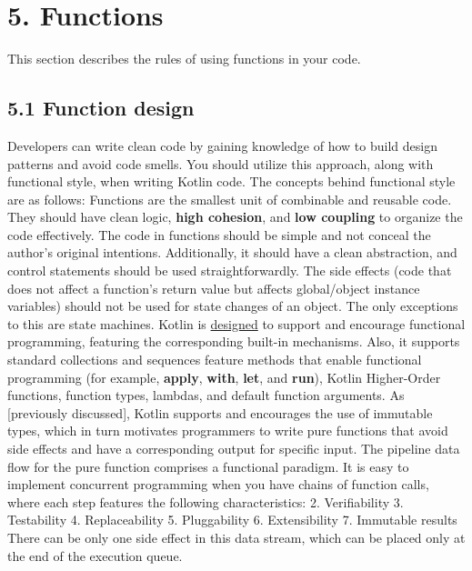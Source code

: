 \section*{\textbf{5. Functions}}
\label{sec:5.}
This section describes the rules of using functions in your code.
\subsection*{\textbf{5.1 Function design}}
\label{sec:5.1}
Developers can write clean code by gaining knowledge of how to build design patterns and avoid code smells.
You should utilize this approach, along with functional style, when writing Kotlin code. 
The concepts behind functional style are as follows: 
Functions are the smallest unit of combinable and reusable code.
They should have clean logic, \textbf{high cohesion}, and \textbf{low coupling} to organize the code effectively.
The code in functions should be simple and not conceal the author's original intentions.
Additionally, it should have a clean abstraction, and control statements should be used straightforwardly.
The side effects (code that does not affect a function's return value but affects global/object instance variables) should not be used for state changes of an object.
The only exceptions to this are state machines.
Kotlin is \href{https://www.slideshare.net/abreslav/whos-more-functional-kotlin-groovy-scala-or-java}{designed} to support and encourage functional programming, featuring the corresponding built-in mechanisms.
Also, it supports standard collections and sequences feature methods that enable functional programming (for example, \textbf{apply}, \textbf{with}, \textbf{let}, and \textbf{run}), Kotlin Higher-Order functions, function types, lambdas, and default function arguments.
As [previously discussed], Kotlin supports and encourages the use of immutable types, which in turn motivates programmers to write pure functions that avoid side effects and have a corresponding output for specific input. 
The pipeline data flow for the pure function comprises a functional paradigm. It is easy to implement concurrent programming when you have chains of function calls, where each step features the following characteristics:
2.	Verifiability
3.	Testability
4.	Replaceability
5.	Pluggability
6.	Extensibility
7.	Immutable results
There can be only one side effect in this data stream, which can be placed only at the end of the execution queue.

